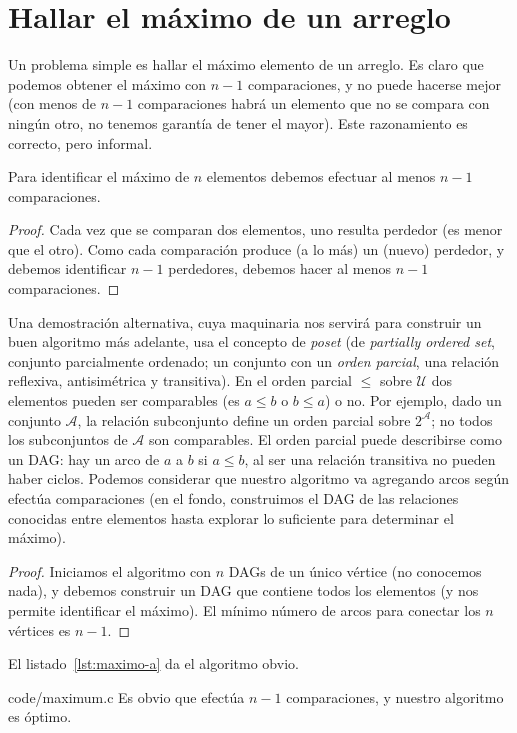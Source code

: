 \section{Hallar el máximo de un arreglo}
\label{sec:max-array}

  Un problema simple es hallar el máximo elemento de un arreglo.
  Es claro que podemos obtener el máximo con \(n - 1\) comparaciones,
  y no puede hacerse mejor
  (con menos de \(n - 1\) comparaciones
   habrá un elemento que no se compara con ningún otro,
   no tenemos garantía de tener el mayor).
  Este razonamiento es correcto,
  pero informal.
  \begin{proposition}
    Para identificar el máximo de \(n\) elementos
    debemos efectuar al menos \(n - 1\) comparaciones.
  \end{proposition}
  \begin{proof}
    Cada vez que se comparan dos elementos,
    uno resulta perdedor
    (es menor que el otro).
    Como cada comparación produce (a lo más) un (nuevo) perdedor,
    y debemos identificar \(n - 1\) perdedores,
    debemos hacer al menos \(n - 1\) comparaciones.
  \end{proof}
  Una demostración alternativa,
  cuya maquinaria nos servirá
  para construir un buen algoritmo más adelante,
  usa el concepto de \emph{poset}
  (de \emph{\foreignlanguage{english}{partially ordered set}},
   conjunto parcialmente ordenado;
   un conjunto con un \emph{orden parcial},
   una relación reflexiva,
   antisimétrica y transitiva).
  En el orden parcial \(\le\) sobre \(\mathscr{U}\)
  dos elementos pueden ser comparables
  (es \(a \le b\) o \(b \le a\))
  o no.
  Por ejemplo,
  dado un conjunto \(\mathscr{A}\),
  la relación subconjunto define un orden parcial sobre \(2^{\mathscr{A}}\);
  no todos los subconjuntos de \(\mathscr{A}\) son comparables.
  El orden parcial puede describirse como un DAG:
  hay un arco de \(a\) a \(b\) si \(a \le b\),
  al ser una relación transitiva no pueden haber ciclos.
  Podemos considerar que nuestro algoritmo va agregando arcos
  según efectúa comparaciones
  (en el fondo,
   construimos el DAG de las relaciones conocidas entre elementos
   hasta explorar lo suficiente para determinar el máximo).
  \begin{proof}
    Iniciamos el algoritmo con \(n\) DAGs de un único vértice
    (no conocemos nada),
    y debemos construir un DAG que contiene todos los elementos
    (y nos permite identificar el máximo).
    El mínimo número de arcos para conectar los \(n\) vértices es \(n - 1\).
  \end{proof}
  El listado~\ref{lst:maximo-a} da el algoritmo obvio.
  
                   {code/maximum.c}
  Es obvio que efectúa \(n - 1\) comparaciones,
  y nuestro algoritmo es óptimo.

